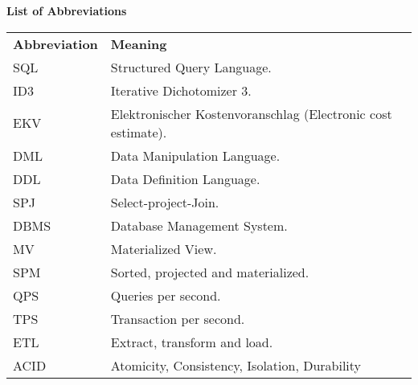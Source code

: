 
% 
\thispagestyle{empty}
\begin{center}
    \huge\textbf{List of Abbreviations}
\end{center}  \vspace{.4cm}

\noindent %
\begin{minipage}{\textwidth}
\begin{tabular}{ll}
    \textbf{Abbreviation} & \textbf{Meaning} \\
    SQL & Structured Query Language. \\
    ID3 & Iterative  Dichotomizer 3. \\
    EKV & Elektronischer Kostenvoranschlag (Electronic cost estimate).\\
    DML & Data Manipulation Language. \\
    DDL & Data Definition Language.\\
    SPJ & Select-project-Join.\\
    DBMS & Database Management System.\\
    MV & Materialized View.\\
    SPM & Sorted, projected and materialized.\\
    QPS & Queries per second.\\
    TPS & Transaction per second.\\
    ETL & Extract, transform and load. \\
    ACID & Atomicity, Consistency, Isolation, Durability\\
\end{tabular}
\end{minipage}
% 

    